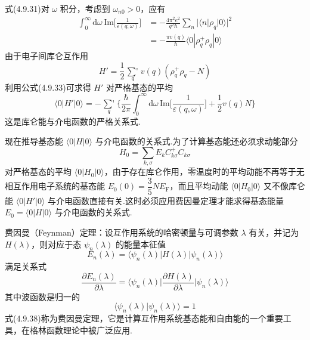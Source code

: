 式(4.9.31)对 $\omega$ 积分，考虑到 $\omega_{n0}>0$，应有
\begin{equation}
\begin{aligned}
  \int_{0}^{\infty}\mathrm{d}\omega\,
  \mathrm{Im}\bigg[\frac{1}{\varepsilon(q,\omega)}\bigg]
  &=-\frac{4\pi^{2}e^{2}}{q^{2}\hbar}\sum_{n}
  |\langle n|\rho_{q}|0\rangle|^{2}\\
  &=-\frac{\pi v(q)}{\hbar}\langle 0|\rho_{q}^{+}\rho_{q}|0\rangle
\end{aligned}
\end{equation}
由于电子间库仑互作用
\begin{equation}
  H'=\frac{1}{2}\mathop{{\sum}'}\limits_{q}v(q)
  \left(\rho_{q}^{+}\rho_{q}-N\right)
\end{equation}
利用公式(4.9.33)可求得 $H'$ 对严格基态的平均
\begin{equation}
  \langle 0|H'|0\rangle=-\mathop{{\sum}'}\limits_{q}
  \bigg\{\frac{\hbar}{2\pi}\int_{0}^{\infty}\mathrm{d}\omega\,
  \mathrm{Im}\bigg[\frac{1}{\varepsilon(q,\omega)}\bigg]
  +\frac{1}{2}v(q)N\bigg\}
\end{equation}
这是库仑能与介电函数的严格关系式.

现在推导基态能 $\langle 0|H|0\rangle$ 与介电函数的关系式.为了计算基态能还必须求动能部分
\begin{equation}
  H_{0}=\sum_{k,\sigma}E_{k}C_{k\sigma}^{+}C_{k\sigma}
\end{equation}
对严格基态的平均 $\langle 0|H_{0}|0\rangle$，由于存在库仑作用，零温度时的平均动能不再等于无相互作用电子系统的基态能 $E_{0}(0)=\dfrac{3}{5}NE_{\mathrm{F}}$，而且平均动能 $\langle 0|H_{0}|0\rangle$ 又不像库仑能 $\langle 0|H'|0\rangle$ 与介电函数直接有关.这时必须应用费因曼定理才能求得基态能量 $E_{0}=\langle 0|H|0\rangle$ 与介电函数的关系式.

费因曼（Feynman）定理：设互作用系统的哈密顿量与可调参数 $\lambda$ 有关，并记为 $H(\lambda)$，则对应于态 $\psi_{n}(\lambda)$ 的能量本征值
\begin{equation}
  E_{n}(\lambda)=\langle\psi_{n}(\lambda)|H(\lambda)|\psi_{n}(\lambda)\rangle
\end{equation}
满足关系式
\begin{equation}
  \frac{\partial E_{n}(\lambda)}{\partial\lambda}
  =\bigg\langle\psi_{n}(\lambda)\bigg|
  \frac{\partial H(\lambda)}{\partial\lambda}\bigg|\psi_{n}(\lambda)\bigg\rangle
\end{equation}
其中波函数是归一的
\begin{equation}
  \langle\psi_{n}(\lambda)|\psi_{n}(\lambda)\rangle=1
\end{equation}
式(4.9.38)称为费因曼定理，它是计算互作用系统基态能和自由能的一个重要工具，在格林函数理论中被广泛应用.


